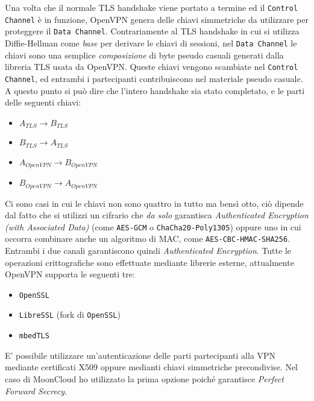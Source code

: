 Una volta che il normale TLS handshake viene portato a termine ed il \texttt{Control Channel}
è in funzione, OpenVPN genera delle chiavi simmetriche da utilizzare per proteggere
il \texttt{Data Channel}. Contrariamente al TLS handshake in cui si utilizza Diffie-Hellman
come \textit{base} per derivare le chiavi di sessioni, nel \texttt{Data Channel} le
chiavi sono una semplice \textit{composizione} di byte pseudo casuali generati
dalla libreria TLS usata da OpenVPN. Queste chiavi
vengono scambiate nel \texttt{Control Channel}, ed entrambi i partecipanti contribuiscono
nel materiale pseudo casuale.\\
A questo punto si può dire che l'intero handshake sia stato completato, e le parti
delle seguenti chiavi:
\begin{itemize}
  \item $A_{TLS} \rightarrow B_{TLS}$
  \item $B_{TLS} \rightarrow A_{TLS}$
  \item $A_{OpenVPN} \rightarrow B_{OpenVPN}$
  \item $B_{OpenVPN} \rightarrow A_{OpenVPN}$
\end{itemize}
Ci sono casi in cui le chiavi non sono quattro in tutto ma bensì otto, ciò dipende
dal fatto che si utilizzi un cifrario che \textit{da solo} garantisca \textit{Authenticated
Encryption (with Associated Data)} (come \texttt{AES-GCM} o \texttt{ChaCha20-Poly1305}) oppure uno in cui
occorra combinare anche un algoritmo di MAC, come \texttt{AES-CBC-HMAC-SHA256}.
Entrambi i due canali garantiscono quindi \textit{Authenticated Encryption}.
Tutte le operazioni crittografiche sono effettuate mediante librerie esterne,
attualmente OpenVPN supporta le seguenti tre:
\begin{itemize}
  \item \texttt{OpenSSL}
  \item \texttt{LibreSSL} (fork di \texttt{OpenSSL})
  \item \texttt{mbedTLS}
\end{itemize}

E' possibile utilizzare un'autenticazione delle parti partecipanti alla VPN mediante
certificati X509 oppure medianti chiavi simmetriche precondivise. Nel caso di MoonCloud
ho utilizzato la prima opzione poiché garantisce \textit{Perfect Forward Secrecy}.



